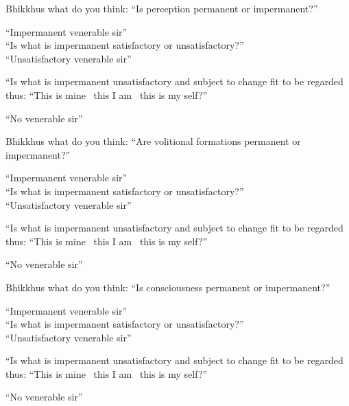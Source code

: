 \begin{english-only-no-hang}
  \begin{english-only-hang}
    Bhikkhus what do you think: ``Is perception permanent or impermanent?''
  \end{english-only-hang}
  ``Impermanent venerable sir''\\
  ``Is what is impermanent satisfactory or unsatisfactory?''\\
  ``Unsatisfactory venerable sir''\\
  \ifninebythirteen\clearpage\fi
  \begin{english-hang-together}
    ``Is what is impermanent unsatisfactory and subject to change fit to be regarded thus: ``This is mine \breathmark\ this I am \breathmark\ this is my self?''
  \end{english-hang-together}
  ``No venerable sir''
\end{english-only-no-hang}

\begin{english-only-no-hang}
  \begin{english-only-hang}
    Bhikkhus what do you think: ``Are volitional formations permanent or impermanent?''
  \end{english-only-hang}
  ``Impermanent venerable sir''\\
  ``Is what is impermanent satisfactory or unsatisfactory?''\\
  ``Unsatisfactory venerable sir''
  \begin{english-hang-together}
    ``Is what is impermanent unsatisfactory and subject to change fit to be regarded thus: ``This is mine \breathmark\ this I am \breathmark\ this is my self?''
  \end{english-hang-together}
  ``No venerable sir''
\end{english-only-no-hang}

\begin{english-only-no-hang}
  \begin{english-only-hang}
    Bhikkhus what do you think: ``Is consciousness permanent or impermanent?''
  \end{english-only-hang}
  ``Impermanent venerable sir''\\
  ``Is what is impermanent satisfactory or unsatisfactory?''\\
  ``Unsatisfactory venerable sir''\\
  \begin{english-hang-together}
    ``Is what is impermanent unsatisfactory and subject to change fit to be regarded thus: ``This is mine \breathmark\ this I am \breathmark\ this is my self?''
  \end{english-hang-together}
  ``No venerable sir''
\end{english-only-no-hang}

